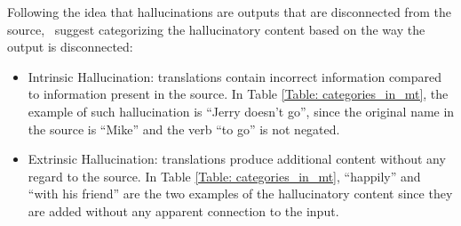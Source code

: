 Following the idea that hallucinations are outputs that are disconnected from the source,~ suggest categorizing the hallucinatory content based on the way the output is disconnected:
\begin{itemize}
    \item Intrinsic Hallucination: translations contain incorrect information compared to information present in the source. 
    In Table \ref{Table: categories_in_mt}, the example of such hallucination is “Jerry doesn't go”, since the original name in the source is “Mike” and the verb “to go” is not negated. 
    \item Extrinsic Hallucination: translations produce additional content without any regard to the source. In Table \ref{Table: categories_in_mt},  “happily” and “with his friend” are the two examples of the hallucinatory content since they are added without any apparent connection to the input.
\end{itemize}

